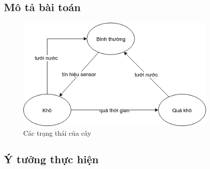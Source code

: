 \documentclass[../report.tex]{subfiles}
\begin{document}
\subsection{Mô tả bài toán}
\begin{figure}[H]
\centering
\includegraphics[width=10cm]{figures/state.png}
\caption{Các trạng thái của cây}
\end{figure}

\subsection{Ý tưởng thực hiện}
\end{document}
